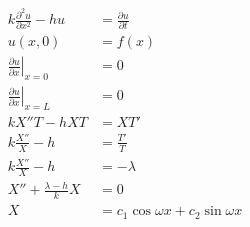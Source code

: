\documentclass{article}
\begin{document}
\begin{align*}
  k \frac{\partial^2 u}{\partial x^2} - h u            & = \frac{\partial u}{\partial t}                                                                                                                                                                         \\
  u(x, 0)                                              & = f(x)                                                                                                                                                                                                  \\
  \left. \frac{\partial u}{\partial x} \right|_{x = 0} & = 0                                                                                                                                                                                                     \\
  \left. \frac{\partial u}{\partial x} \right|_{x = L} & = 0                                                                                                                                                                                                     \\
  k X'' T - h X T                                      & = X T'                                                                                                                                                                                                  \\
  k \frac{X''}{X} - h                                  & = \frac{T'}{T}                                                                                                                                                                                          \\
  k \frac{X''}{X} - h                                  & = -\lambda                                                                                                                                                                                              \\
  X'' + \frac{\lambda - h}{k} X                        & = 0                                                                                                                                                                                                     \\
  X                                                    & = c_1 \cos \omega x + c_2 \sin \omega x                                                                                                                                                                 \\

\end{align*}
\end{document}
